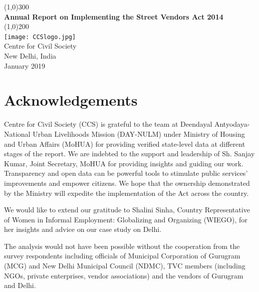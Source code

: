 \documentclass[a4paper, 12pt, twoside]{article}
\begin{document}
\newpage

\begin{titlepage}
\begin{center}
\line(1,0){300}\\
[0.25in]
\huge{\bfseries \textcolor{CCSbrown} {Annual Report on Implementing the Street Vendors Act 2014}} \\
[0.5cm]

\line(1,0){200}\\
[2in]
\texttt{[image: CCSlogo.jpg]} \\
[1.5cm]
\LARGE{Centre for Civil Society} \\
[1.5cm]
{\Large New Delhi, India} \\
{\Large January 2019} \\
[1.85cm]


\end{center}
\end{titlepage}

\section*{Acknowledgements}
Centre for Civil Society (CCS) is grateful to the team at Deendayal Antyodaya-National Urban Livelihoods Mission (DAY-NULM) under Ministry of Housing and Urban Affairs (MoHUA) for providing verified state-level data at different stages of the report. We are indebted to the support and leadership of Sh. Sanjay Kumar, Joint Secretary, MoHUA for providing insights and guiding our work. Transparency and open data can be powerful tools to stimulate public services’ improvements and empower citizens. We hope that the ownership demonstrated by the Ministry will expedite the implementation of the Act across the country.

We would like to extend our gratitude to Shalini Sinha, Country Representative of Women in Informal Employment: Globalizing and Organizing (WIEGO), for her insights and advice on our case study on Delhi.

The analysis would not have been possible without the cooperation from the survey respondents including officials of Municipal Corporation of Gurugram (MCG) and New Delhi Municipal Council (NDMC), TVC members (including NGOs, private enterprises, vendor associations) and the vendors of Gurugram and Delhi.
\end{document}
